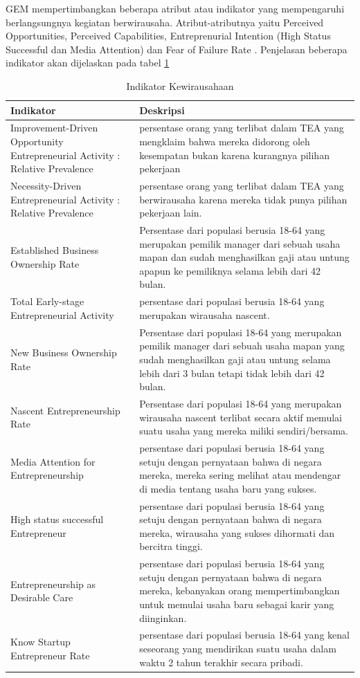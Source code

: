 GEM mempertimbangkan beberapa atribut atau indikator yang mempengaruhi berlangsungnya kegiatan berwirausaha. Atribut-atributnya yaitu Perceived Opportunities, Perceived Capabilities, Entreprenurial Intention (High Status Successful dan Media Attention) dan Fear of Failure Rate \cite{GEM2013}. Penjelasan beberapa indikator akan dijelaskan pada tabel \ref{tabelindikator}

\begin{table}[H]
\centering
\caption{Indikator Kewirausahaan}
\begin{tabular}{|p{3cm}|p{10cm}|}
\hline
Indikator & Deskripsi\\
\hline
Improvement-Driven Opportunity Entrepreneurial Activity : Relative Prevalence & persentase orang yang terlibat dalam TEA yang mengklaim bahwa mereka didorong oleh kesempatan bukan karena kurangnya pilihan pekerjaan\\
\hline
Necessity-Driven Entrepreneurial Activity : Relative Prevalence & persentase orang yang terlibat dalam TEA yang berwirausaha karena mereka tidak punya pilihan pekerjaan lain.\\
\hline
Established Business Ownership Rate & Persentase dari populasi berusia 18-64 yang merupakan pemilik manager dari sebuah usaha mapan dan sudah menghasilkan gaji atau untung apapun ke pemiliknya selama lebih dari 42 bulan.\\
\hline
Total Early-stage Entrepreneurial Activity & persentase dari populasi berusia 18-64 yang merupakan wirausaha nascent.\\
\hline
New Business Ownership Rate & Persentase dari populasi 18-64 yang merupakan pemilik manager dari sebuah usaha mapan yang sudah menghasilkan gaji atau untung selama lebih dari 3 bulan tetapi tidak lebih dari 42 bulan.\\
\hline
Nascent Entrepreneurship Rate & Persentase dari populasi 18-64 yang merupakan wirausaha nascent terlibat secara aktif memulai suatu usaha yang mereka miliki sendiri/bersama.\\
\hline
Media Attention for Entrepreneurship & persentase dari populasi berusia 18-64 yang setuju dengan pernyataan bahwa di negara mereka, mereka sering melihat atau mendengar di media tentang usaha baru yang sukses.\\
\hline
High status successful Entrepreneur & persentase dari populasi berusia 18-64 yang setuju dengan pernyataan bahwa di negara mereka, wirausaha yang sukses dihormati dan bercitra tinggi.\\
\hline
Entrepreneurship as Desirable Care & persentase dari populasi berusia 18-64 yang setuju dengan pernyataan bahwa di negara mereka, kebanyakan orang mempertimbangkan untuk memulai usaha baru sebagai karir yang diinginkan.\\
\hline
Know Startup Entrepreneur Rate & persentase dari populasi berusia 18-64 yang kenal seseorang yang mendirikan suatu usaha dalam waktu 2 tahun terakhir secara pribadi.\\
\hline
\end{tabular}
\label{tabelindikator}
\end{table}



